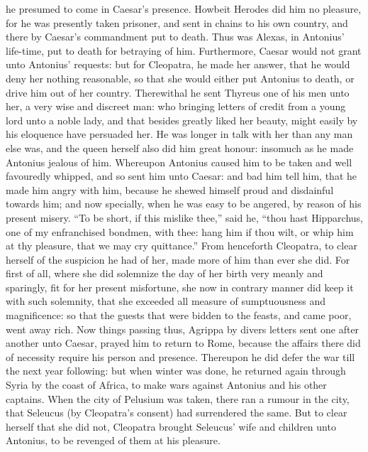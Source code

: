 \documentclass{book}
\begin{document}
he presumed to come in Caesar's presence. Howbeit Herodes did him no
pleasure, for he was presently taken prisoner, and sent in chains
to his own country, and there by Caesar's commandment put to death.
Thus was Alexas, in Antonius' life-time, put to death for betraying of
him.
Furthermore, Caesar would not grant unto Antonius' requests: but
for Cleopatra, he made her answer, that he would deny her nothing
reasonable, so that she would either put Antonius to death, or drive
him out of her country. Therewithal he sent Thyreus one of his men
unto her, a very wise and discreet man: who bringing letters of
credit from a young lord unto a noble lady, and that besides greatly
liked her beauty, might easily by his eloquence have persuaded her.
He was longer in talk with her than any man else was, and the queen
herself also did him great honour: insomuch as he made Antonius
jealous of him. Whereupon Antonius caused him to be taken and well
favouredly whipped, and so sent him unto Caesar: and bad him tell
him, that he made him angry with him, because he shewed himself
proud and disdainful towards him; and now specially, when he was
easy to be angered, by reason of his present misery. ``To be short,
if this mislike thee,'' said he, ``thou hast Hipparchus, one of my
enfranchised bondmen, with thee: hang him if thou wilt, or whip him at
thy pleasure, that we may cry quittance.'' From henceforth Cleopatra,
to clear herself of the suspicion he had of her, made more of him than
ever she did. For first of all, where she did solemnize the day of
her birth very meanly and sparingly, fit for her present misfortune,
she now in contrary manner did keep it with such solemnity, that she
exceeded all measure of sumptuousness and magnificence: so that the
guests that were bidden to the feasts, and came poor, went away rich.
Now things passing thus, Agrippa by divers letters sent one after
another unto Caesar, prayed him to return to Rome, because the affairs
there did of necessity require his person and presence.
Thereupon he did defer the war till the next year following: but when
winter was done, he returned again through Syria by the coast of
Africa, to make wars a\-gainst Antonius and his other captains. When
the city of Pelusium was taken,  there ran a rumour in the city, that Seleucus (by
Cleopatra's consent) had surrendered the same. But to clear herself
that she did not, Cleopatra brought Seleucus' wife and children unto
Antonius, to be revenged of them at his pleasure.
\end{document}
